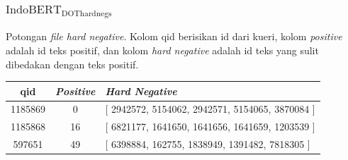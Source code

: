 \documentclass[10pt]{beamer}
\newcommand{\f}[1]{\textit{#1}}
\newcommand{\bo}[1]{\textbf{#1}}
\begin{document}
\begin{frame}
    \frametitle{$\text{IndoBERT}_{\text{DOThardnegs}}$}
    Potongan \f{file hard negative}. Kolom qid berisikan id dari kueri, kolom \f{positive} adalah id teks positif, dan kolom \f{hard negative} adalah id teks yang sulit dibedakan dengan teks positif.
    \begin{table}[!ht]
        \centering
        \small
        \label{tab:hardnegsbm25}
        \begin{tabular}{|c|c|p{8cm}|}
            \hline
            \bo{qid} & \bo{\f{Positive}} & \bo{\f{Hard Negative}}                                           \\
            \hline
            1185869 &  0  & [ 2942572, 5154062, 2942571, 5154065, 3870084 ] \\
            \hline
            1185868 &  16  & [ 6821177, 1641650, 1641656, 1641659, 1203539 ] \\
            \hline
            597651 &  49  & [ 6398884, 162755, 1838949, 1391482, 7818305 ] \\
            \hline
        \end{tabular}
    \end{table}
\end{frame}
\end{document}
